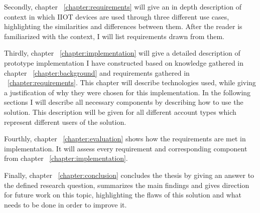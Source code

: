 Secondly, chapter ~\ref{chapter:requirements} will give an in depth description of context in which IIOT devices are used through three different use cases, highlighting the similarities and differences between them. After the reader is familiarized with the context, I will list requirements drawn from them.

Thirdly, chapter ~\ref{chapter:implementation} will give a detailed description of prototype implementation I have constructed based on knowledge gathered in chapter ~\ref{chapter:background} and requirements gathered in ~\ref{chapter:requirements}. This chapter will describe technologies used, while giving a justification of why they were chosen for this implementation. In the following sections I will describe all necessary components by describing how to use the solution. This description will be given for all different account types which represent different users of the solution.

Fourthly, chapter ~\ref{chapter:evaluation} shows how the requirements are met in implementation. It will assess every requirement and corresponding component from chapter ~\ref{chapter:implementation}.

Finally, chapter ~\ref{chapter:conclusion} concludes the thesis by giving an answer to the defined research question, summarizes the main findings and gives direction for future work on this topic, highlighting the flaws of this solution and what needs to be done in order to improve it.
